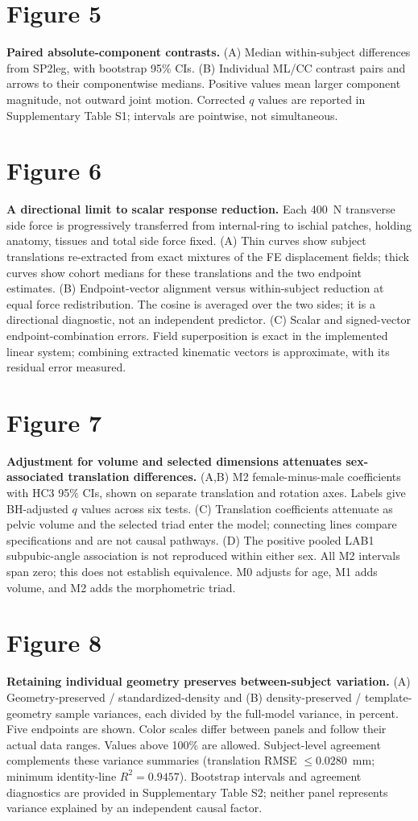 \section*{Figure 5}
\textbf{Paired absolute-component contrasts.} (A) Median within-subject differences from SP2leg, with bootstrap 95\% CIs. (B) Individual ML/CC contrast pairs and arrows to their componentwise medians. Positive values mean larger component magnitude, not outward joint motion. Corrected $q$ values are reported in Supplementary Table S1; intervals are pointwise, not simultaneous.

\section*{Figure 6}
\textbf{A directional limit to scalar response reduction.} Each 400~N transverse side force is progressively transferred from internal-ring to ischial patches, holding anatomy, tissues and total side force fixed. (A) Thin curves show subject translations re-extracted from exact mixtures of the FE displacement fields; thick curves show cohort medians for these translations and the two endpoint estimates. (B) Endpoint-vector alignment versus within-subject reduction at equal force redistribution. The cosine is averaged over the two sides; it is a directional diagnostic, not an independent predictor. (C) Scalar and signed-vector endpoint-combination errors. Field superposition is exact in the implemented linear system; combining extracted kinematic vectors is approximate, with its residual error measured.

\section*{Figure 7}
\textbf{Adjustment for volume and selected dimensions attenuates sex-associated translation differences.} (A,B) M2 female-minus-male coefficients with HC3 95\% CIs, shown on separate translation and rotation axes. Labels give BH-adjusted $q$ values across six tests. (C) Translation coefficients attenuate as pelvic volume and the selected triad enter the model; connecting lines compare specifications and are not causal pathways. (D) The positive pooled LAB1 subpubic-angle association is not reproduced within either sex. All M2 intervals span zero; this does not establish equivalence. M0 adjusts for age, M1 adds volume, and M2 adds the morphometric triad.

\section*{Figure 8}
\textbf{Retaining individual geometry preserves between-subject variation.} (A) Geometry-preserved / standardized-density and (B) density-preserved / template-geometry sample variances, each divided by the full-model variance, in percent. Five endpoints are shown. Color scales differ between panels and follow their actual data ranges. Values above 100\% are allowed. Subject-level agreement complements these variance summaries (translation RMSE $\leq0.0280$~mm; minimum identity-line $R^2=0.9457$). Bootstrap intervals and agreement diagnostics are provided in Supplementary Table S2; neither panel represents variance explained by an independent causal factor.
